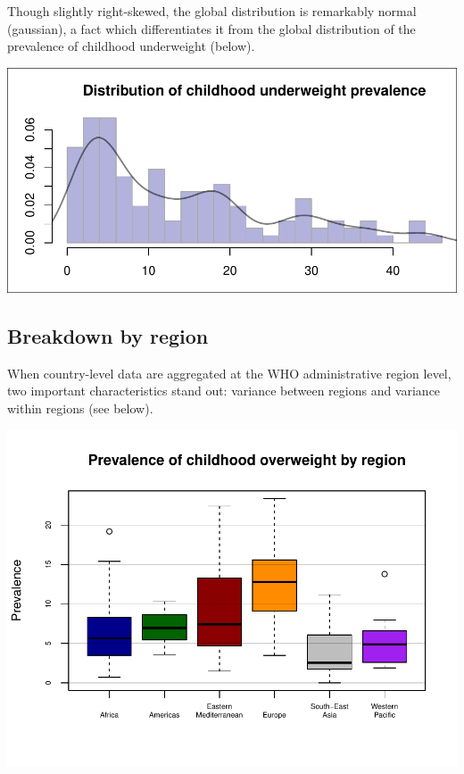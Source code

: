 \documentclass[11pt]{article}
\begin{document}
\begin{multicols}{2}
Though slightly right-skewed, the global distribution is remarkably normal (gaussian), a fact which differentiates it from the global distribution of the prevalence of childhood underweight (below).\\

\begin{center}
\includegraphics{global_variance-004}
\end{center}

\subsection*{Breakdown by region}

When country-level data are aggregated at the WHO administrative region level, two important characteristics stand out: variance between regions and variance within regions (see below).

\begin{center}
\includegraphics{global_variance-005}
\end{center}

\end{multicols}
\end{document}
